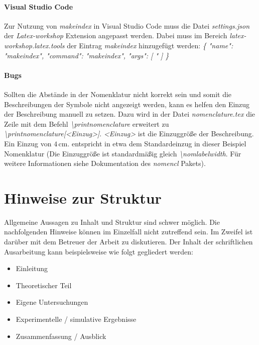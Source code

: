 \paragraph{Visual Studio Code}
Zur Nutzung von \textit{makeindex} in Visual Studio Code muss die Datei \textit{settings.json} der \textit{Latex-workshop} Extension angepasst werden.
Dabei muss im Bereich \textit{latex-workshop.latex.tools} der Eintrag \textit{makeindex} hinzugefügt werden: 
\textit{ \{
  "name": "makeindex",
  "command": "makeindex",
  "args": [
      "%
  ]
  \}
}

\paragraph{Bugs}

\sloppy
Sollten die Abstände in der Nomenklatur nicht korrekt sein und somit die Beschreibungen der Symbole nicht angezeigt werden, kann es helfen den Einzug der Beschreibung manuell zu setzen. Dazu wird in der Datei \textit{nomenclature.tex} die Zeile mit dem Befehl \textit{\textbackslash printnomenclature} erweitert zu \textit{\textbackslash printnomenclature[<Einzug>]}. \textit{<Einzug>} ist die Einzuggröße der Beschreibung. Ein Einzug von $4\,\mathrm{cm}$. entspricht in etwa dem Standardeinzug in dieser Beispiel Nomenklatur (Die Einzuggröße ist standardmäßig gleich \textit{\textbackslash nomlabelwidth}. Für weitere Informationen siehe Dokumentation des \textit{nomencl} Pakets). 


\section{Hinweise zur Struktur}
\label{hinweise:struktur}

Allgemeine Aussagen zu Inhalt und Struktur sind schwer möglich. Die nachfolgenden Hinweise können im Einzelfall nicht zutreffend sein. Im Zweifel ist darüber mit dem Betreuer der Arbeit zu diskutieren.
Der Inhalt der schriftlichen Ausarbeitung kann beispielsweise wie
folgt gegliedert werden:

\begin{itemize}
	\item Einleitung
	\item Theoretischer Teil
	\item Eigene Untersuchungen
	\item Experimentelle / simulative Ergebnisse
	\item Zusammenfassung / Ausblick
\end{itemize}

